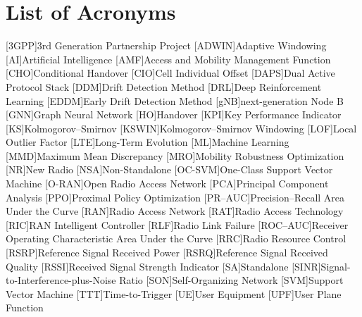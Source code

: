 %

\chapter*{List of Acronyms}

\begin{acronym}
  [3GPP]{3rd Generation Partnership Project}
  [ADWIN]{Adaptive Windowing}
  [AI]{Artificial Intelligence}
  [AMF]{Access and Mobility Management Function}
  [CHO]{Conditional Handover}
  [CIO]{Cell Individual Offset}
  [DAPS]{Dual Active Protocol Stack}
  [DDM]{Drift Detection Method}
  [DRL]{Deep Reinforcement Learning}
  [EDDM]{Early Drift Detection Method}
  [gNB]{next-generation Node B}
  [GNN]{Graph Neural Network}
  [HO]{Handover}
  [KPI]{Key Performance Indicator}
  [KS]{Kolmogorov--Smirnov}
  [KSWIN]{Kolmogorov--Smirnov Windowing}
  [LOF]{Local Outlier Factor}
  [LTE]{Long-Term Evolution}
  [ML]{Machine Learning}
  [MMD]{Maximum Mean Discrepancy}
  [MRO]{Mobility Robustness Optimization}
  [NR]{New Radio}
  [NSA]{Non-Standalone}
  [OC-SVM]{One-Class Support Vector Machine}
  [O-RAN]{Open Radio Access Network}
  [PCA]{Principal Component Analysis}
  [PPO]{Proximal Policy Optimization}
  [PR--AUC]{Precision--Recall Area Under the Curve}
  [RAN]{Radio Access Network}
  [RAT]{Radio Access Technology}
  [RIC]{RAN Intelligent Controller}
  [RLF]{Radio Link Failure}
  [ROC--AUC]{Receiver Operating Characteristic Area Under the Curve}
  [RRC]{Radio Resource Control}
  [RSRP]{Reference Signal Received Power}
  [RSRQ]{Reference Signal Received Quality}
  [RSSI]{Received Signal Strength Indicator}
  [SA]{Standalone}
  [SINR]{Signal-to-Interference-plus-Noise Ratio}
  [SON]{Self-Organizing Network}
  [SVM]{Support Vector Machine}
  [TTT]{Time-to-Trigger}
  [UE]{User Equipment}
  [UPF]{User Plane Function}
\end{acronym}
